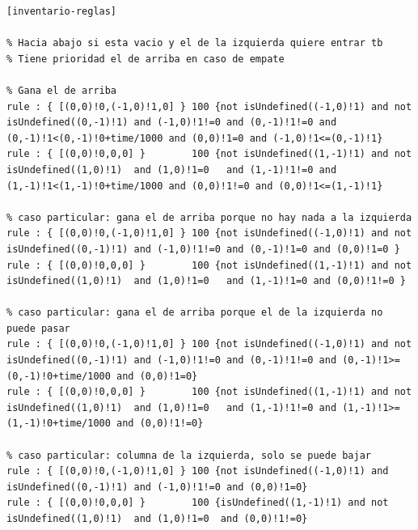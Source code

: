\documentclass[10pt]{article}
\begin{document}
\begin{minipage}{1\textwidth}
	\centering
	\begin{lstlisting}
[inventario-reglas]

% Hacia abajo si esta vacio y el de la izquierda quiere entrar tb
% Tiene prioridad el de arriba en caso de empate

% Gana el de arriba
rule : { [(0,0)!0,(-1,0)!1,0] } 100 {not isUndefined((-1,0)!1) and not isUndefined((0,-1)!1) and (-1,0)!1!=0 and (0,-1)!1!=0 and (0,-1)!1<(0,-1)!0+time/1000 and (0,0)!1=0 and (-1,0)!1<=(0,-1)!1}
rule : { [(0,0)!0,0,0] }        100 {not isUndefined((1,-1)!1) and not isUndefined((1,0)!1)  and (1,0)!1=0   and (1,-1)!1!=0 and (1,-1)!1<(1,-1)!0+time/1000 and (0,0)!1!=0 and (0,0)!1<=(1,-1)!1}

% caso particular: gana el de arriba porque no hay nada a la izquierda
rule : { [(0,0)!0,(-1,0)!1,0] } 100 {not isUndefined((-1,0)!1) and not isUndefined((0,-1)!1) and (-1,0)!1!=0 and (0,-1)!1=0 and (0,0)!1=0 }
rule : { [(0,0)!0,0,0] }        100 {not isUndefined((1,-1)!1) and not isUndefined((1,0)!1)  and (1,0)!1=0   and (1,-1)!1=0 and (0,0)!1!=0 }

% caso particular: gana el de arriba porque el de la izquierda no puede pasar
rule : { [(0,0)!0,(-1,0)!1,0] } 100 {not isUndefined((-1,0)!1) and not isUndefined((0,-1)!1) and (-1,0)!1!=0 and (0,-1)!1!=0 and (0,-1)!1>=(0,-1)!0+time/1000 and (0,0)!1=0}
rule : { [(0,0)!0,0,0] }        100 {not isUndefined((1,-1)!1) and not isUndefined((1,0)!1)  and (1,0)!1=0   and (1,-1)!1!=0 and (1,-1)!1>=(1,-1)!0+time/1000 and (0,0)!1!=0}

% caso particular: columna de la izquierda, solo se puede bajar
rule : { [(0,0)!0,(-1,0)!1,0] } 100 {not isUndefined((-1,0)!1) and isUndefined((0,-1)!1) and (-1,0)!1!=0 and (0,0)!1=0}
rule : { [(0,0)!0,0,0] }        100 {isUndefined((1,-1)!1) and not isUndefined((1,0)!1)  and (1,0)!1=0  and (0,0)!1!=0}
	\end{lstlisting}
\end{minipage}
\end{document}

